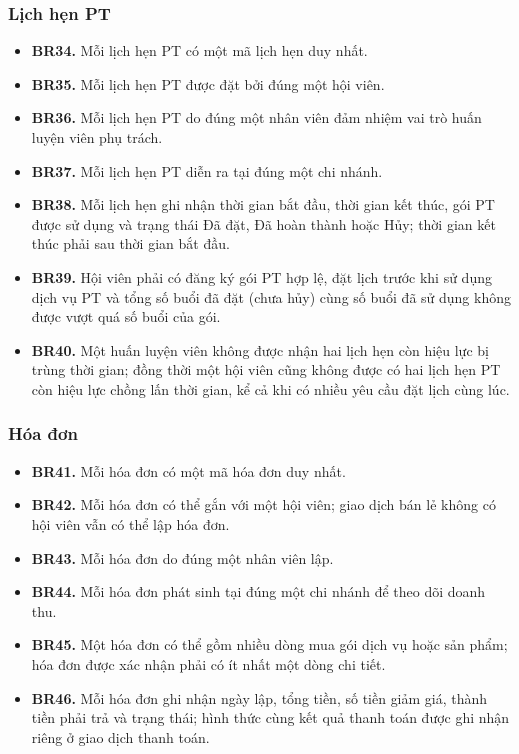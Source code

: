 \documentclass[11pt, a4paper]{article}
\begin{document}
\subsubsection{Lịch hẹn PT}
\begin{itemize}
    \item \textbf{BR34.} Mỗi lịch hẹn PT có một mã lịch hẹn duy nhất.
    \item \textbf{BR35.} Mỗi lịch hẹn PT được đặt bởi đúng một hội viên.
    \item \textbf{BR36.} Mỗi lịch hẹn PT do đúng một nhân viên đảm nhiệm vai trò huấn luyện viên phụ trách.
    \item \textbf{BR37.} Mỗi lịch hẹn PT diễn ra tại đúng một chi nhánh.
    \item \textbf{BR38.} Mỗi lịch hẹn ghi nhận thời gian bắt đầu, thời gian kết thúc, gói PT được sử dụng và trạng thái Đã đặt, Đã hoàn thành hoặc Hủy; thời gian kết thúc phải sau thời gian bắt đầu.
    \item \textbf{BR39.} Hội viên phải có đăng ký gói PT hợp lệ, đặt lịch trước khi sử dụng dịch vụ PT và tổng số buổi đã đặt (chưa hủy) cùng số buổi đã sử dụng không được vượt quá số buổi của gói.
    \item \textbf{BR40.} Một huấn luyện viên không được nhận hai lịch hẹn còn hiệu lực bị trùng thời gian; đồng thời một hội viên cũng không được có hai lịch hẹn PT còn hiệu lực chồng lấn thời gian, kể cả khi có nhiều yêu cầu đặt lịch cùng lúc.
\end{itemize}

\subsubsection{Hóa đơn}
\begin{itemize}
    \item \textbf{BR41.} Mỗi hóa đơn có một mã hóa đơn duy nhất.
    \item \textbf{BR42.} Mỗi hóa đơn có thể gắn với một hội viên; giao dịch bán lẻ không có hội viên vẫn có thể lập hóa đơn.
    \item \textbf{BR43.} Mỗi hóa đơn do đúng một nhân viên lập.
    \item \textbf{BR44.} Mỗi hóa đơn phát sinh tại đúng một chi nhánh để theo dõi doanh thu.
    \item \textbf{BR45.} Một hóa đơn có thể gồm nhiều dòng mua gói dịch vụ hoặc sản phẩm; hóa đơn được xác nhận phải có ít nhất một dòng chi tiết.
    \item \textbf{BR46.} Mỗi hóa đơn ghi nhận ngày lập, tổng tiền, số tiền giảm giá, thành tiền phải trả và trạng thái; hình thức cùng kết quả thanh toán được ghi nhận riêng ở giao dịch thanh toán.
\end{itemize}
\end{document}
